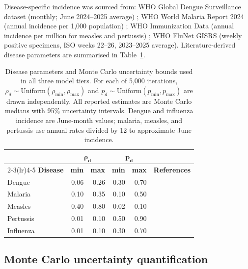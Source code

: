 \documentclass[12pt, a4paper]{article}
\begin{document}
Disease-specific incidence was sourced from: WHO Global Dengue
Surveillance dataset (monthly; June 2024--2025 average)
\citep{WHO_dengue}; WHO World Malaria Report 2024 (annual incidence
per 1,000 population) \citep{whoWMR2024}; WHO Immunization Data
(annual incidence per million for measles and pertussis)
\citep{WHO_immunization}; WHO FluNet GISRS (weekly positive specimens,
ISO weeks 22--26, 2023--2025 average). Literature-derived disease
parameters are summarised in Table~\ref{tab:params}.

\begin{table}[htbp]
\centering
\caption{Disease parameters and Monte Carlo uncertainty bounds used
  in all three model tiers. For each of 5,000 iterations,
  $\rho_d \sim \mathrm{Uniform}(\rho_{\min},\rho_{\max})$ and
  $p_d \sim \mathrm{Uniform}(p_{\min},p_{\max})$ are drawn
  independently. All reported estimates are Monte Carlo medians
  with 95\% uncertainty intervals. Dengue and influenza incidence
  are June-month values; malaria, measles, and pertussis use
  annual rates divided by 12 to approximate June incidence.}
\label{tab:params}
\small
\setlength{\tabcolsep}{6pt}
\begin{tabular}{l rr rr l}
\toprule
&
  \multicolumn{2}{c}{$\boldsymbol{\rho_d}$} &
  \multicolumn{2}{c}{$\boldsymbol{p_d}$} & \\
\cmidrule(lr){2-3}\cmidrule(lr){4-5}
\textbf{Disease} &
  \textbf{min} & \textbf{max} &
  \textbf{min} & \textbf{max} &
  \textbf{References} \\
\midrule
Dengue    & 0.06 & 0.26 & 0.30 & 0.70 & \citep{bhatt2013,undurraga2013} \\[3pt]
Malaria   & 0.10 & 0.35 & 0.10 & 0.50 & \citep{whoWMR2024,lindblade2013,topazian2020} \\[3pt]
Measles   & 0.40 & 0.80 & 0.02 & 0.10 & \citep{simons2012,whittle1999,helfand1998} \\[3pt]
Pertussis & 0.01 & 0.10 & 0.50 & 0.90 & \citep{mclaughlin2016,craig2020,althouse2015} \\[3pt]
Influenza & 0.01 & 0.10 & 0.30 & 0.70 & \citep{mccarthy2020,hayward2014,carrat2008,leung2015} \\
\bottomrule
\end{tabular}
\end{table}

\subsection{Monte Carlo uncertainty quantification}
\end{document}
